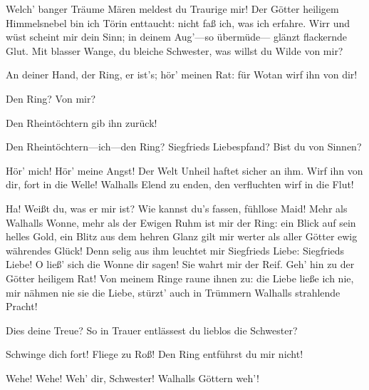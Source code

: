 \begin{drama}


\Brunnhildespeaks



Welch' banger Träume Mären
meldest du Traurige mir!
Der Götter heiligem Himmelsnebel
bin ich Törin enttaucht:
nicht faß ich, was ich erfahre.
Wirr und wüst scheint mir dein Sinn;
in deinem Aug'---so übermüde---
glänzt flackernde Glut.
Mit blasser Wange, du bleiche Schwester,
was willst du Wilde von mir?
 

\Waltrautespeaks



An deiner Hand, der Ring,
er ist's; hör' meinen Rat:
für Wotan wirf ihn von dir!
 

\Brunnhildespeaks

Den Ring? Von mir?
 

\Waltrautespeaks

Den Rheintöchtern gib ihn zurück!
 

\Brunnhildespeaks

Den Rheintöchtern---ich---den Ring?
Siegfrieds Liebespfand?
Bist du von Sinnen?
 

\Waltrautespeaks

Hör' mich! Hör' meine Angst!
Der Welt Unheil haftet sicher an ihm.
Wirf ihn von dir, fort in die Welle!
Walhalls Elend zu enden,
den verfluchten wirf in die Flut!
 

\Brunnhildespeaks

Ha! Weißt du, was er mir ist?
Wie kannst du's fassen, fühllose Maid!
Mehr als Walhalls Wonne,
mehr als der Ewigen Ruhm
ist mir der Ring:
ein Blick auf sein helles Gold,
ein Blitz aus dem hehren Glanz
gilt mir werter
als aller Götter ewig währendes Glück!
Denn selig aus ihm leuchtet mir Siegfrieds Liebe:
Siegfrieds Liebe!
O ließ' sich die Wonne dir sagen!
Sie wahrt mir der Reif.
Geh' hin zu der Götter heiligem Rat!
Von meinem Ringe raune ihnen zu:
die Liebe ließe ich nie,
mir nähmen nie sie die Liebe,
stürzt' auch in Trümmern
Walhalls strahlende Pracht!
 

\Waltrautespeaks

Dies deine Treue?
So in Trauer
entlässest du lieblos die Schwester?
 

\Brunnhildespeaks

Schwinge dich fort!
Fliege zu Roß!
Den Ring entführst du mir nicht!
 

\Waltrautespeaks

Wehe! Wehe!
Weh' dir, Schwester!
Walhalls Göttern weh'!
 



\end{drama}
